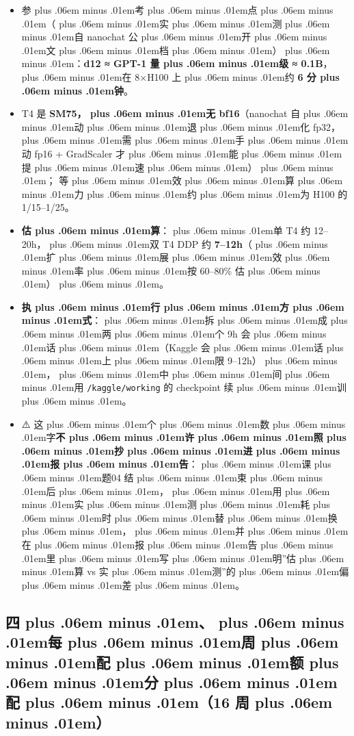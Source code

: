 \documentclass[
]{article}
\newcommand{\passthrough}[1]{#1}
\providecommand{\tightlist}{%
  \setlength{\itemsep}{0pt}\setlength{\parskip}{0pt}}
\def\zh#1{{\zhfont #1}}
\def\sym#1{{\symfont #1}}
\def\zhglue{\hskip0pt plus .06em minus .01em}
\begin{document}
\begin{itemize}
\tightlist
\item
  \zh{参\zhglue 考\zhglue 点\zhglue （\zhglue 实\zhglue 测\zhglue 自} nanochat \zh{公\zhglue 开\zhglue 文\zhglue 档\zhglue ）\zhglue ：}\textbf{d12 \sym{≈} GPT-1 \zh{量\zhglue 级} \sym{≈} 0.1B}\zh{，\zhglue 在} 8\sym{×}H100 \zh{上\zhglue 约} \textbf{6 \zh{分\zhglue 钟}}\zh{。}
\item
  T4 \zh{是} \textbf{SM75\zh{，\zhglue 无} bf16}\zh{（}nanochat \zh{自\zhglue 动\zhglue 退\zhglue 化} fp32\zh{，\zhglue 需\zhglue 手\zhglue 动} fp16 + GradScaler \zh{才\zhglue 能\zhglue 提\zhglue 速\zhglue ）\zhglue ；} \zh{等\zhglue 效\zhglue 算\zhglue 力\zhglue 约\zhglue 为} H100 \zh{的} 1/15--1/25\zh{。}
\item
  \textbf{\zh{估\zhglue 算}}\zh{：\zhglue 单} T4 \zh{约} 12--20h\zh{，\zhglue 双} T4 DDP \zh{约} \textbf{7--12h}\zh{（\zhglue 扩\zhglue 展\zhglue 效\zhglue 率\zhglue 按} 60--80\% \zh{估\zhglue ）\zhglue 。}
\item
  \textbf{\zh{执\zhglue 行\zhglue 方\zhglue 式}}\zh{：\zhglue 拆\zhglue 成\zhglue 两\zhglue 个} 9h \zh{会\zhglue 话\zhglue （}Kaggle \zh{会\zhglue 话\zhglue 上\zhglue 限} 9--12h\zh{）\zhglue ，\zhglue 中\zhglue 间\zhglue 用} \passthrough{\lstinline!/kaggle/working!} \zh{的} checkpoint \zh{续\zhglue 训\zhglue 。}
\item
  \sym{⚠️} \zh{这\zhglue 个\zhglue 数\zhglue 字}\textbf{\zh{不\zhglue 许\zhglue 照\zhglue 抄\zhglue 进\zhglue 报\zhglue 告}}\zh{：\zhglue 课\zhglue 题}04 \zh{结\zhglue 束\zhglue 后\zhglue ，\zhglue 用\zhglue 实\zhglue 测\zhglue 耗\zhglue 时\zhglue 替\zhglue 换\zhglue ，\zhglue 并\zhglue 在\zhglue 报\zhglue 告\zhglue 里\zhglue 写\zhglue 明}''\zh{估\zhglue 算} vs \zh{实\zhglue 测}''\zh{的\zhglue 偏\zhglue 差\zhglue 。}
\end{itemize}

\subsection{\zh{四\zhglue 、\zhglue 每\zhglue 周\zhglue 配\zhglue 额\zhglue 分\zhglue 配\zhglue （}16 \zh{周\zhglue ）}}\label{ux56dbux6bcfux5468ux914dux989dux5206ux914d16-ux5468}
\end{document}
